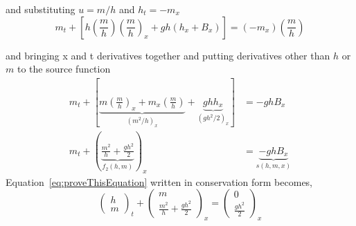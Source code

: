 \begin{description}
	and substituting $u=m/h$ and $h_t=-m_x$ 
	\begin{equation}
		m_t + [h \left(\frac{m}{h}\right) \left(\frac{m}{h}\right)_x + gh( h_x + B_x )] = (-m_x) \left(\frac{m}{h}\right) \label{eq:secondtoConservation} 
	\end{equation}
	
	and bringing x and t derivatives together and putting derivatives other than $h$ or $m$ to the source function 
	\begin{align}
		m_t + [\underbrace{m \left(\frac{m}{h}\right)_x + m_x \left(\frac{m}{h}\right)}_{(m^2/h)_x} + \underbrace{gh h_x}_{(gh^2/2)_x}] &= -gh B_x \label{eq:thirdConservation} \\
			m_t + (\underbrace{\frac{m^2}{h} + \frac{gh^2}{2}}_{f_2(h,m)})_x &= \underbrace{-gh B_x}_{s(h,m,x)}\label{eq:fourthConservation}
	\end{align} %
	Equation~\eqref{eq:proveThisEquation} written in conservation form becomes,
\begin{equation}
	\begin{pmatrix}
		h\\m 
	\end{pmatrix}
	_t + 
	\begin{pmatrix}
		m\\\frac{m^2}{h} + \frac{gh^2}{2} 
	\end{pmatrix}
	_x = 
	\begin{pmatrix}
		0\\ \frac{gh^2}{2}
	\end{pmatrix}_x
	\label{eq:proveThisEquationSolved}
\end{equation} %
\end{description}

